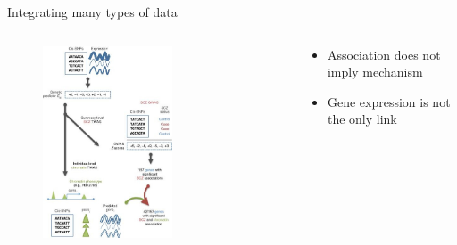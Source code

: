 \documentclass[aspectratio=169,12pt]{beamer}
\begin{document}
\begin{frame}{Integrating many types of data}

	\begin{columns}
		\begin{column}{0.6\textwidth}
			\begin{figure}
				\includegraphics[width=0.62\textwidth]{gusev2018/1-TWAS_schematic_cropped}
			\end{figure}
		\end{column}

		\begin{column}{0.4\textwidth}
			\begin{itemize}
				\item Association does not imply mechanism
				\item Gene expression is not the only link
			\end{itemize}
		\end{column}
	\end{columns}


\end{frame}
\end{document}
